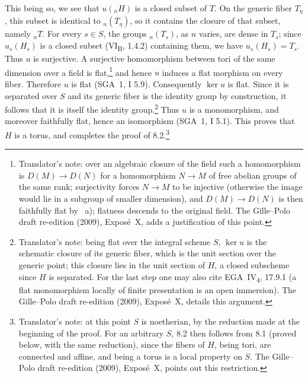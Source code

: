 This being so, we see that \(u({}_nH)\) is a closed subset of
\(T\). On the generic fiber \(T_\eta\), this subset is identical to
\({}_n(T_\eta)\), so it contains the closure of that subset, namely
\({}_nT\). For every \(s\in S\), the groups \({}_n(T_s)\), as \(n\)
varies, are dense in \(T_s\); since \(u_s(H_s)\) is a closed subset
(VI\textsubscript{B}, 1.4.2) containing them, we have
\(u_s(H_s)=T_s\). Thus \(u\) is surjective. A surjective homomorphism
between tori of the same dimension over a field is
flat,\footnote{Translator's note: over an algebraic closure of the field
such a homomorphism is \(D(M)\to D(N)\) for a homomorphism \(N\to M\) of
free abelian groups of the same rank; surjectivity forces \(N\to M\) to be
injective (otherwise the image would lie in a subgroup of smaller
dimension), and \(D(M)\to D(N)\) is then faithfully flat by
~a); flatness descends to the
original field. The Gille--Polo draft re-edition (2009), Exposé~X, adds a justification of this
point.} and hence \(u\) induces a flat
morphism on every fiber. Therefore \(u\) is flat (SGA~1, I 5.9).
Consequently \(\ker u\) is flat. Since it is separated over \(S\) and its
generic fiber is the identity group by construction, it follows that it is
itself the identity group.\footnote{Translator's note: being flat over the
integral scheme \(S\), \(\ker u\) is the schematic closure of its generic
fiber, which is the unit section over the generic point; this closure lies
in the unit section of \(H\), a closed subscheme since \(H\) is separated.
For the last step one may also cite EGA~IV\textsubscript{4}, 17.9.1 (a flat
monomorphism locally of finite presentation is an open immersion).
The Gille--Polo draft re-edition (2009), Exposé~X, details this argument.} Thus \(u\) is a monomorphism, and moreover
faithfully flat, hence an isomorphism (SGA~1, I 5.1). This proves that
\(H\) is a torus, and completes the proof of 8.2.\footnote{Translator's note:
at this point \(S\) is noetherian, by the reduction made at the beginning
of the proof. For an arbitrary \(S\), 8.2 then follows from 8.1 (proved
below, with the same reduction), since the fibers of \(H\), being tori, are
connected and affine, and being a torus is a local property on \(S\).
The Gille--Polo draft re-edition (2009), Exposé~X, points out this restriction.}

